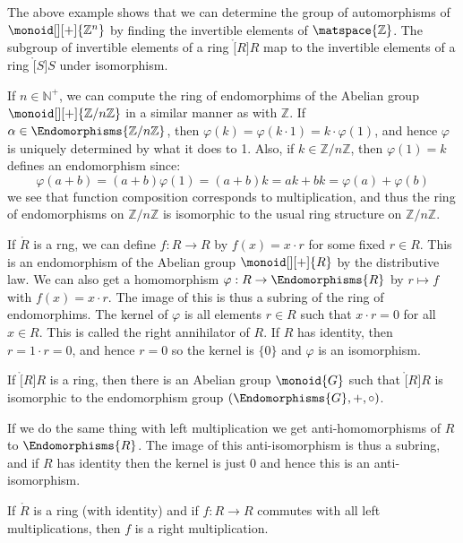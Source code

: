 \documentclass{book}                                                           %
\begin{document}
            The above example shows that we can determine the group of
            automorphisms of $\monoid[][+]{\mathbb{Z}^{n}}$ by finding the
            invertible elements of $\matspace{\mathbb{Z}}$. The subgroup of
            invertible elements of a ring $\ring[R]{R}$ map to the
            invertible elements of a ring $\ring[S]{S}$ under isomorphism.
            \begin{example}
                If $n\in\mathbb{N}^{+}$, we can compute the ring of
                endomorphims of the Abelian group
                $\monoid[][+]{\mathbb{Z}/n\mathbb{Z}}$ in a similar manner
                as with $\mathbb{Z}$. If
                $\alpha\in\Endomorphisms{\mathbb{Z}/n\mathbb{Z}}$, then
                $\varphi(k)=\varphi(k\cdot{1})=k\cdot\varphi(1)$, and hence
                $\varphi$ is uniquely determined by what it does to 1. Also,
                if $k\in\mathbb{Z}/n\mathbb{Z}$, then $\varphi(1)=k$ defines
                an endomorphism since:
                \begin{equation}
                    \varphi(a+b)=(a+b)\varphi(1)
                        =(a+b)k
                        =ak+bk
                        =\varphi(a)+\varphi(b)
                \end{equation}
                we see that function composition corresponds to
                multiplication, and thus the ring of endomorphisms on
                $\mathbb{Z}/n\mathbb{Z}$ is isomorphic to the usual ring
                structure on $\mathbb{Z}/n\mathbb{Z}$.
            \end{example}
            If $\ring{R}$ is a rng, we can define $f:R\rightarrow{R}$ by
            $f(x)=x\cdot{r}$ for some fixed $r\in{R}$. This is an
            endomorphism of the Abelian group $\monoid[][+]{R}$ by the
            distributive law. We can also get a homomorphism
            $\varphi:R\rightarrow\Endomorphisms{R}$ by
            $r\mapsto{f}$ with $f(x)=x\cdot{r}$. The image of this is thus
            a subring of the ring of endomorphims. The kernel of $\varphi$
            is all elements $r\in{R}$ such that $x\cdot{r}=0$ for all
            $x\in{R}$. This is called the right annihilator of $R$. If $R$
            has identity, then $r=1\cdot{r}=0$, and hence $r=0$ so the
            kernel is $\{0\}$ and $\varphi$ is an isomorphism.
            \begin{theorem}
                If $\ring[R]{R}$ is a ring, then there is an Abelian group
                $\monoid{G}$ such that $\ring[R]{R}$ is isomorphic to the
                endomorphism group $(\Endomorphisms{G},+,\circ)$.
            \end{theorem}
            If we do the same thing with left multiplication we get
            anti-homomorphisms of $R$ to $\Endomorphisms{R}$. The image of
            this anti-isomorphism is thus a subring, and if $R$ has identity
            then the kernel is just $0$ and hence this is an
            anti-isomorphism.
            \begin{theorem}
                If $\ring{R}$ is a ring (with identity) and if
                $f:R\rightarrow{R}$ commutes with all left multiplications,
                then $f$ is a right multiplication.
            \end{theorem}
\end{document}
